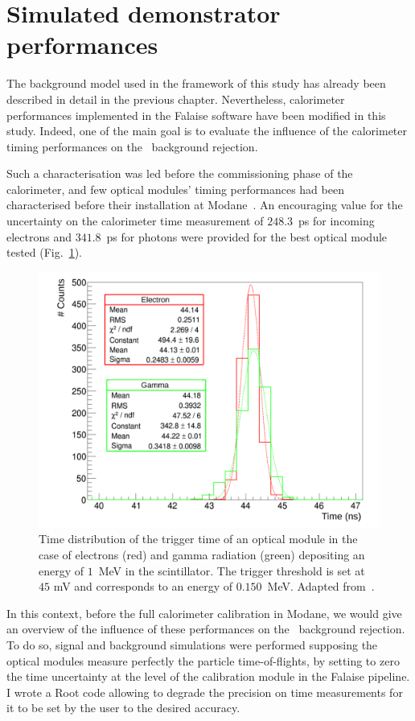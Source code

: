 \section{Simulated demonstrator performances}

The background model used in the framework of this study has already been described in detail in the previous chapter.
Nevertheless, calorimeter performances implemented in the Falaise software have been modified in this study.
Indeed, one of the main goal is to evaluate the influence of the calorimeter timing performances on the \Tl\ background rejection.

Such a characterisation was led before the commissioning phase of the calorimeter, and few optical modules' timing performances had been characterised before their installation at Modane~\cite{HuberThesis}.
An encouraging value for the uncertainty on the calorimeter time measurement of $248.3$~ps for incoming electrons and $341.8$~ps for photons were provided for the best optical module tested (Fig.~\ref{fig:Arnaud_RMS_PM}).
\begin{figure}[!h]
  \centering
  \includegraphics[width=13cm]{timedifference/fig_timediff/Arnaud_RMS_PM.pdf}
  \caption{Time distribution of the trigger time of an optical module in the case of electrons (red) and gamma radiation (green) depositing an energy of $1$~MeV in the scintillator.
    The trigger threshold is set at $45$ mV and corresponds to an energy of $0.150$~MeV.
    Adapted from~\cite{HuberThesis}.
  \label{fig:Arnaud_RMS_PM}}
\end{figure}

In this context, before the full calorimeter calibration in Modane, we would give an overview of the influence of these performances on the \Tl\ background rejection.
To do so, signal and background simulations were performed supposing the optical modules measure perfectly the particle time-of-flights, by setting to zero the time uncertainty at the level of the calibration module in the Falaise pipeline.
I wrote a Root code allowing to degrade the precision on time measurements for it to be set by the user to the desired accuracy.

